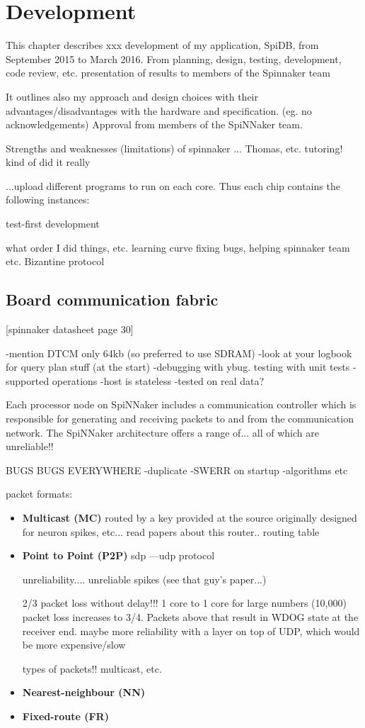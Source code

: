 \chapter{Development}

This chapter describes xxx development of my application, SpiDB, from September 2015 to March 2016.
From planning, design, testing, development, code review, etc. presentation of results to members of the Spinnaker team

It outlines also my approach and design choices with their advantages/disadvantages with the hardware and specification. (eg. no acknowledgements)
Approval from members of the SpiNNaker team.

Strengths and weaknesses (limitations) of spinnaker
...
Thomas, etc.
tutoring! kind of did it really


...upload different programs to run on each core.
Thus each chip contains the following instances: 

test-first development

what order I did things, etc.
learning curve
fixing bugs, helping spinnaker team etc.
Bizantine protocol

\section{Board communication fabric}
\label{sec:background}

[spinnaker datasheet page 30]

-mention DTCM only 64kb (so preferred to use SDRAM)
-look at your logbook for query plan stuff (at the start)
-debugging with ybug. testing with unit tests
-supported operations
-host is stateless
-tested on real data?

Each processor node on SpiNNaker includes a communication controller which is responsible for generating and receiving packets to and from the communication network.
The SpiNNaker architecture offers a range of...
all of which are unreliable!!

BUGS BUGS EVERYWHERE
-duplicate
-SWERR on startup
-algorithms etc

packet formats:

\begin{itemize}
\item \textbf{Multicast (MC)}
routed by a key provided at the source
originally designed for neuron spikes, etc... read papers about this
router.. routing table
\item \textbf{Point to Point (P2P)}
sdp
---udp protocol

unreliability....
unreliable spikes (see that guy's paper...)

2/3 packet loss without delay!!! 1 core to 1 core
for large numbers (10,000) packet loss increases to 3/4. Packets above that result in WDOG state at the receiver end.
maybe more reliability with a layer on top of UDP, which would be more expensive/slow

types of packets!!
multicast, etc.
\item \textbf{Nearest-neighbour (NN)}
\item \textbf{Fixed-route (FR)}
\end{itemize}

